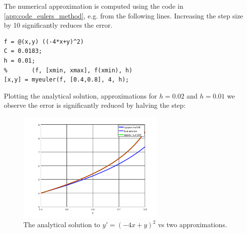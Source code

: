 \documentclass[a4paper]{article}
\begin{document}
\begin{soln}
The numerical approximation is computed using the code in \ref{app:code_eulers_method}, e.g. from the following lines. Increasing the step size by 10 significantly reduces the error.
\begin{verbatim}
f = @(x,y) ((-4*x+y)^2)
C = 0.0183;
h = 0.01;
%       (f, [xmin, xmax], f(xmin), h)
[x,y] = myeuler(f, [0.4,0.8], 4, h);
\end{verbatim}
Plotting the analytical solution, approximations for $h=0.02$ and $h=0.01$ we observe the error is significantly reduced by halving the step:
\begin{figure}[H]
    \centering
    \includegraphics[height=5.5cm]{img/euler/example_euler_anal_approx.png}
    \caption{The analytical solution to $y' = (-4x+y)^2$ vs two approximations.}
\end{figure}
\end{soln}

%
\end{document}
